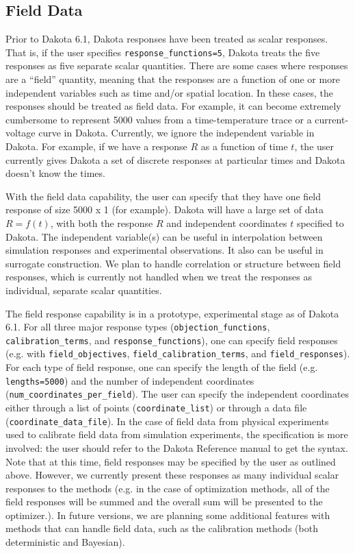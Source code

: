 \subsection{Field Data}
Prior to Dakota 6.1, Dakota responses have been treated as 
scalar responses.  That is, if the user specifies 
\texttt{response\_functions=5}, Dakota treats the five responses as five separate scalar quantities.  There are some cases where responses are a ``field'' quantity, meaning that the responses are a function of one or more independent variables such as time and/or spatial location.  In these cases, the responses should be treated as field data.  For example, it can become 
extremely cumbersome to represent 5000 values from a 
time-temperature trace or a current-voltage curve in Dakota.  
Currently, we ignore the independent variable in Dakota.  
For example, if we have a response $R$ as a function of time $t$, 
the user currently gives Dakota a set of discrete responses at particular times and Dakota doesn't know the times.  

With the field data capability, the user can specify that 
they have one field response of size 5000 x 1 (for example). 
Dakota will have a large set 
of data $R=f(t)$, with both the response $R$ and independent 
coordinates $t$ specified to Dakota.  
The independent variable(s) can be useful in interpolation between simulation responses and experimental observations.  
It also can be useful in surrogate construction.  
We plan to handle correlation or structure between 
field responses, which is currently not handled when 
we treat the responses as individual, separate scalar 
quantities. 

The field response capability is in a prototype, experimental 
stage as of Dakota 6.1.  For all three major response 
types (\texttt{objection\_functions}, \texttt{calibration\_terms}, and \texttt{response\_functions}), one can specify field responses (e.g. with \texttt{field\_objectives}, \texttt{field\_calibration\_terms}, and \texttt{field\_responses}).  For each 
type of field response, one can specify the length of the field (e.g. \texttt{lengths=5000}) and the number of independent coordinates (\texttt{num\_coordinates\_per\_field}).  The user can specify the independent coordinates either through a list of points (\texttt{coordinate\_list}) or through a data file (\texttt{coordinate\_data\_file}).  In the case of field data from physical experiments used to calibrate field data from simulation experiments, the specification is more involved:  the user should refer to the Dakota Reference manual to get the syntax. 
Note that at this time, field responses may be specified by the user as outlined above.  However, we currently present these responses as many individual scalar responses to the methods (e.g. in the case of optimization methods, all of the field responses will be summed and the overall sum will be presented to the optimizer.).   
In future versions, we are planning some additional features with methods 
that can handle field data, such as the calibration methods (both deterministic and Bayesian). 
 
